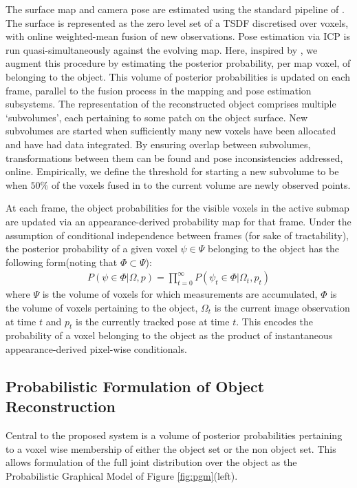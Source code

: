 The surface map and camera pose are estimated using the standard pipeline of \cite{Newcombe2011,Prisacariu2014}. The surface is represented as the zero level set of a TSDF discretised over voxels, with online weighted-mean fusion of new observations. Pose estimation via ICP is run quasi-simultaneously against the evolving map. Here, inspired by \cite{Kolev2006}, we augment this procedure by estimating the posterior probability, per map voxel, of belonging to the object. This volume of posterior probabilities is updated on each frame, parallel to the fusion process in the mapping and pose estimation subsystems. The representation of the reconstructed object comprises multiple `subvolumes', each pertaining to some patch on the object surface. New subvolumes are started when sufficiently many new voxels have been allocated and have had data integrated. By ensuring overlap between subvolumes, transformations between them can be found and pose inconsistencies addressed, online. Empirically, we define the threshold for starting a new subvolume to be when $50\%$ of the voxels fused in to the current volume are newly observed points.

At each frame, the object probabilities for the visible voxels in the active submap are updated via an appearance-derived probability map for that frame. Under the assumption of conditional independence between frames (for sake of tractability), the posterior probability of a given voxel $\psi \in \Psi$ belonging to the object has the following form(noting that $\Phi \subset \Psi$):
\begin{equation}
\label{eq:membership}
\begin{split}
P(\psi \in \Phi | \Omega, p) = \prod_{t=0}^{\infty} P(\psi_{t} \in \Phi | \Omega_{t}, p_{t})
\end{split}
\end{equation}
where $\Psi$ is the volume of voxels for which measurements are accumulated, $\Phi$ 
is the volume of voxels pertaining to the object, $\Omega_{t}$ is the current image observation at time $t$ and $p_{t}$ is the currently tracked pose at time $t$.
This encodes the probability of a voxel belonging to the object as the product of instantaneous appearance-derived pixel-wise conditionals.

\subsection{Probabilistic Formulation of Object Reconstruction}
Central to the proposed system is a volume of posterior probabilities pertaining to a voxel wise membership of either the 
object set or the non object set. This allows formulation of the full joint distribution over the object as the Probabilistic 
Graphical Model of Figure \ref{fig:pgm}(left).

